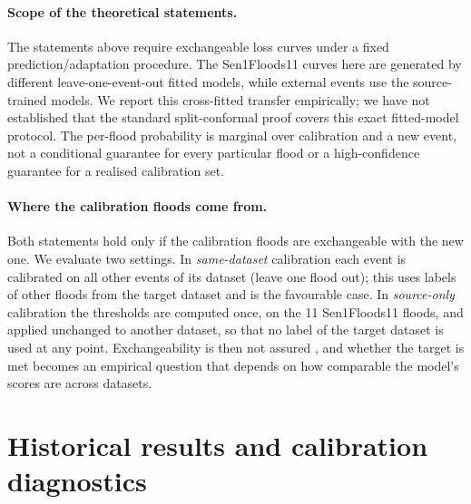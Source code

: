 \paragraph{Scope of the theoretical statements.} The statements above require exchangeable loss curves under a fixed prediction/adaptation procedure. The Sen1Floods11 curves here are generated by different leave-one-event-out fitted models, while external events use the source-trained models. We report this cross-fitted transfer empirically; we have not established that the standard split-conformal proof covers this exact fitted-model protocol. The per-flood probability is marginal over calibration and a new event, not a conditional guarantee for every particular flood or a high-confidence guarantee for a realised calibration set.

\paragraph{Where the calibration floods come from.} Both statements hold only if the calibration floods are exchangeable with the new one. We evaluate two settings. In \emph{same-dataset} calibration each event is calibrated on all other events of its dataset (leave one flood out); this uses labels of other floods from the target dataset and is the favourable case. In \emph{source-only} calibration the thresholds are computed once, on the 11 Sen1Floods11 floods, and applied unchanged to another dataset, so that no label of the target dataset is used at any point. Exchangeability is then not assured \citep{tibshirani2019covshift,barber2023beyond}, and whether the target is met becomes an empirical question that depends on how comparable the model's scores are across datasets.

\section{Historical results and calibration diagnostics}\label{sec:historical}

